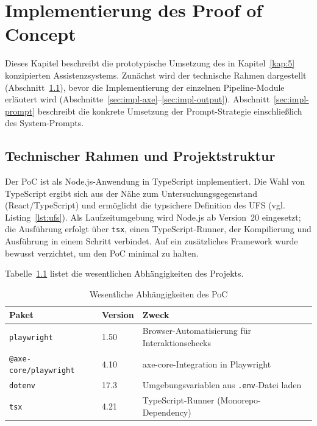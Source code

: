 \chapter{Implementierung des Proof of Concept} \label{kap:6}

Dieses Kapitel beschreibt die prototypische Umsetzung des in Kapitel~\ref{kap:5} konzipierten Assistenzsystems. Zunächst wird der technische Rahmen dargestellt (Abschnitt~\ref{sec:techstack}), bevor die Implementierung der einzelnen Pipeline-Module erläutert wird (Abschnitte~\ref{sec:impl-axe}--\ref{sec:impl-output}). Abschnitt~\ref{sec:impl-prompt} beschreibt die konkrete Umsetzung der Prompt-Strategie einschließlich des System-Prompts.

\section{Technischer Rahmen und Projektstruktur}
\label{sec:techstack}

Der \ac{PoC} ist als Node.js-Anwendung in TypeScript implementiert. Die Wahl von TypeScript ergibt sich aus der Nähe zum Untersuchungsgegenstand (React/TypeScript) und ermöglicht die typsichere Definition des \ac{UFS} (vgl. Listing~\ref{lst:ufs}). Als Laufzeitumgebung wird Node.js ab Version~20 eingesetzt; die Ausführung erfolgt über \texttt{tsx}, einen TypeScript-Runner, der Kompilierung und Ausführung in einem Schritt verbindet. Auf ein zusätzliches Framework wurde bewusst verzichtet, um den \ac{PoC} minimal zu halten.

Tabelle~\ref{tab:dependencies} listet die wesentlichen Abhängigkeiten des Projekts.

\begin{table}[H]
\centering
\renewcommand{\arraystretch}{1.15}
\begin{tabular}{@{}llp{6.5cm}@{}}
\toprule
\textbf{Paket} & \textbf{Version} & \textbf{Zweck} \\
\midrule
\texttt{playwright} & 1.50 & Browser-Automatisierung für Interaktionschecks \\
\texttt{@axe-core/playwright} & 4.10 & axe-core-Integration in Playwright \\
\texttt{dotenv} & 17.3 & Umgebungsvariablen aus \texttt{.env}-Datei laden \\
\texttt{tsx} & 4.21 & TypeScript-Runner (Monorepo-Dependency) \\
\bottomrule
\end{tabular}
\caption{Wesentliche Abhängigkeiten des \acs{PoC}}
\label{tab:dependencies}
\end{table}

